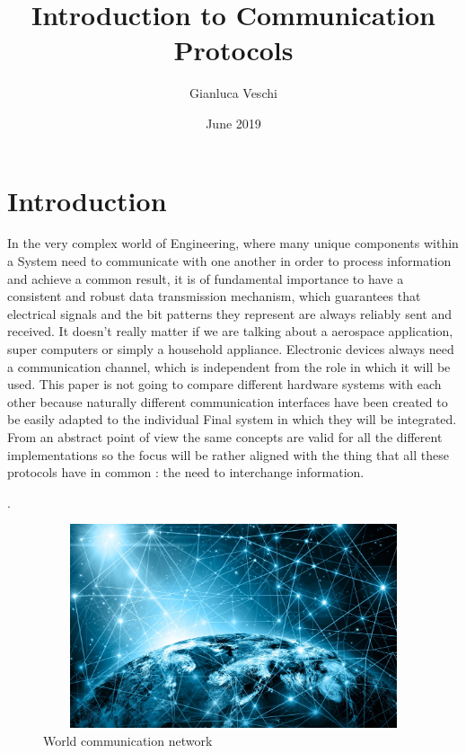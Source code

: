 \documentclass{article}
\title{Introduction to Communication Protocols}
\author{Gianluca Veschi }
\date{June 2019}
\begin{document}
\maketitle

\section{Introduction}
In the very complex world of Engineering, where many unique components within a System need to communicate with one another in order to process information and achieve a common result, it is of fundamental importance to have a consistent and robust data transmission mechanism, which guarantees that electrical signals and the bit patterns they represent are always reliably sent and received. 
\newline 
\newline     
It doesn't really matter if we are talking about a aerospace application, super computers or simply a household appliance. Electronic devices always need a communication channel, which is independent from the role in which it will be used. 
\newline 
\newline 
This paper is not going to compare different hardware systems with each other because naturally different communication interfaces have been created to be easily adapted to the individual Final system in which they will be integrated. From an abstract point of view the same concepts are valid for all the different implementations so the focus will be rather aligned with the thing that all these protocols have in common : the need to interchange information. 

\newline 
\newline 
.
\begin{figure}[h]    
    \centering
    \includegraphics[width=13cm, height=6cm,center]{images/world_networks}
    \caption{World communication network}
\end{figure}
\end{document}
